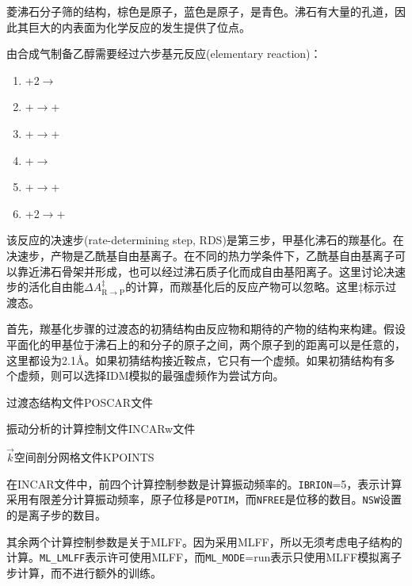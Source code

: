 菱沸石分子筛的结构，棕色是原子，蓝色是原子，是青色。沸石有大量的孔道，因此其巨大的内表面为化学反应的发生提供了位点。

由合成气制备乙醇需要经过六步基元反应\textrm{(elementary reaction)}：
\begin{enumerate}
	\item {}+2$\longrightarrow$
	\item {}+$\longrightarrow$+
	\item {}+$\longrightarrow$+
	\item {}+$\longrightarrow$
	\item {}+$\longrightarrow$+
	\item {}+2$\longrightarrow$+
\end{enumerate}
该反应的决速步\textrm{(rate-determining step, RDS)}是第三步，甲基化沸石的羰基化。在决速步，产物是乙酰基自由基离子。在不同的热力学条件下，乙酰基自由基离子可以靠近沸石骨架并形成，也可以经过沸石质子化而成自由基阳离子。这里讨论决速步的活化自由能$\Delta A_{\mathrm{R}\rightarrow\mathrm{P}}^{\ddagger}$的计算，而羰基化后的反应产物可以忽略。这里$\ddagger$标示过渡态。

首先，羰基化步骤的过渡态的初猜结构由反应物和期待的产物的结构来构建。假设平面化的甲基位于沸石上的和分子的原子之间，两个原子到的距离可以是任意的，这里都设为\textrm{2.1\AA}。如果初猜结构接近鞍点，它只有一个虚频。如果初猜结构有多个虚频，则可以选择\textrm{IDM}模拟的最强虚频作为尝试方向。

过渡态结构文件\textrm{POSCAR}文件

振动分析的计算控制文件\textrm{INCAR}w文件

$\vec k$空间剖分网格文件\textrm{KPOINTS}

在\textrm{INCAR}文件中，前四个计算控制参数是计算振动频率的。\texttt{IBRION}=5，表示计算采用有限差分计算振动频率，原子位移是\texttt{POTIM}，而\texttt{NFREE}是位移的数目。\texttt{NSW}设置的是离子步的数目。%

其余两个计算控制参数是关于\textrm{MLFF}。因为采用\textrm{MLFF}，所以无须考虑电子结构的计算。\texttt{ML\_LMLFF}表示许可使用\textrm{MLFF}，而\texttt{ML\_MODE}=\textrm{run}表示只使用\textrm{MLFF}模拟离子步计算，而不进行额外的训练。

